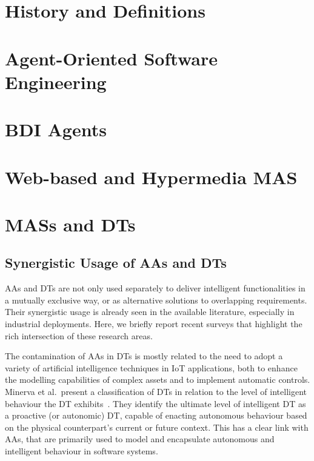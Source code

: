 \section{History and Definitions}

\section{Agent-Oriented Software Engineering}

\section{\acl{BDI} Agents}

\section{Web-based and Hypermedia \acs{MAS}}

\section{\aclp{MAS} and \aclp{DT}}

\subsection{Synergistic Usage of AAs and DTs}
\label{ssec:synergy}


AAs and DTs are not only used separately 
to deliver intelligent functionalities 
in a mutually exclusive way, 
or as alternative solutions to overlapping requirements.
Their synergistic usage is already seen in the available literature, 
especially in industrial deployments. Here, we briefly report recent surveys that highlight the rich intersection of these research areas.

The contamination of AAs in DTs is mostly related to the need to adopt a variety of artificial intelligence techniques in IoT applications, both to enhance the modelling capabilities of complex assets and to implement automatic controls.
Minerva et al.\ present a classification of DTs in relation to the level of intelligent behaviour the DT exhibits~\cite{Minerva2023}.
They identify the ultimate level of intelligent DT as a proactive (or autonomic) DT, capable of enacting autonomous behaviour based on the physical counterpart's current or future context.
This has a clear link with AAs, that are primarily used to model and encapsulate autonomous and intelligent behaviour in software systems.

